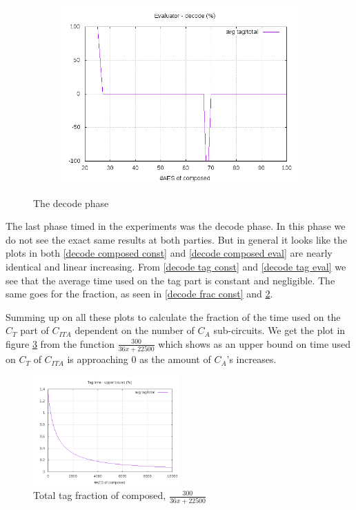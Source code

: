 \documentclass[10pt,a4paper]{article}
\newcommand{\todo}[1]{}
\renewcommand{\todo}[1]{{\color{red} TODO: {#1}} \\}
\begin{document}
\begin{figure}[h]
\begin{subfigure}[t]{0.3\textwidth}
        \includegraphics[width=\textwidth]{eval_decode_frac}
        \caption{}
        \label{decode frac eval}
    \end{subfigure}
    \caption{The decode phase}
\end{figure}

The last phase timed in the experiments was the decode phase.
In this phase we do not see the exact same results at both parties. But in general it looks like the plots in both \ref{decode composed const} and \ref{decode composed eval} are nearly identical and linear increasing. From \ref{decode tag const} and \ref{decode tag eval} we see that the average time used on the tag part is constant and negligible. The same goes for the fraction, as seen in \ref{decode frac const} and \ref{decode frac eval}.

\bigskip
Summing up on all these plots to calculate the fraction of the time used on the $C_T$ part of $C_{ITA}$ dependent on the number of $C_A$ sub-circuits. We get the plot in figure \ref{total frac} from the function $\frac{300}{36x+22500}$ which shows as an upper bound on time used on $C_T$ of $C_{ITA}$ is approaching 0 as the amount of $C_A$'s increases.

\begin{figure}[h]
    \centering
    \includegraphics[width=0.5\textwidth]{total_frac}
    \caption{Total tag fraction of composed, $\frac{300}{36x+22500}$}
    \label{total frac}
\end{figure}
\end{document}
